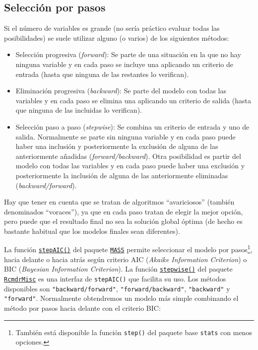\documentclass[
]{book}
\theoremstyle{break}
\theoremstyle{nonumberplain}
\begin{document}
\hypertarget{selecciuxf3n-por-pasos}{%
\subsection{Selección por pasos}\label{selecciuxf3n-por-pasos}}

Si el número de variables es grande (no sería práctico evaluar todas las posibilidades)
se suele utilizar alguno (o varios) de los siguientes métodos:

\begin{itemize}
\item
  Selección progresiva (\emph{forward}): Se parte de una situación en la
  que no hay ninguna variable y en cada paso se incluye una aplicando
  un criterio de entrada (hasta que ninguna de las restantes lo
  verifican).
\item
  Eliminación progresiva (\emph{backward}): Se parte del modelo con todas
  las variables y en cada paso se elimina una aplicando un criterio
  de salida (hasta que ninguna de las incluidas lo verifican).
\item
  Selección paso a paso (\emph{stepwise}): Se combina un criterio de entrada y uno
  de salida.
  Normalmente se parte sin ninguna variable y en cada paso puede haber
  una inclusión y posteriormente la exclusión de alguna de las anteriormente
  añadidas (\emph{forward/backward}).
  Otra posibilidad es partir del modelo con todas las variables y en cada paso
  puede haber una exclusión y posteriormente la inclusión de alguna de las
  anteriormente eliminadas (\emph{backward/forward}).
\end{itemize}

Hay que tener en cuenta que se tratan de algoritmos ``avariciosos'' (también denominados ``voraces''), ya que en cada paso tratan de elegir la mejor opción, pero puede que el resultado final no sea la solución global óptima (de hecho es bastante habitual que los modelos finales sean diferentes).

La función \href{https://rdrr.io/pkg/MASS/man/stepAIC.html}{\texttt{stepAIC()}} del paquete \href{https://CRAN.R-project.org/package=MASS}{\texttt{MASS}} permite seleccionar el modelo por pasos\footnote{También está disponible la función \texttt{step()} del paquete base \texttt{stats} con menos opciones.}, hacia delante o hacia atrás según criterio AIC (\emph{Akaike Information Criterion}) o BIC (\emph{Bayesian Information Criterion}).
La función \href{https://rdrr.io/pkg/RcmdrMisc/man/stepwise.html}{\texttt{stepwise()}} del paquete \href{https://CRAN.R-project.org/package=RcmdrMisc}{\texttt{RcmdrMisc}} es una interfaz de \texttt{stepAIC()} que facilita su uso.
Los métodos disponibles son \texttt{"backward/forward"}, \texttt{"forward/backward"}, \texttt{"backward"} y \texttt{"forward"}.
Normalmente obtendremos un modelo más simple combinando el método por pasos hacia delante con el criterio BIC:
\end{document}
